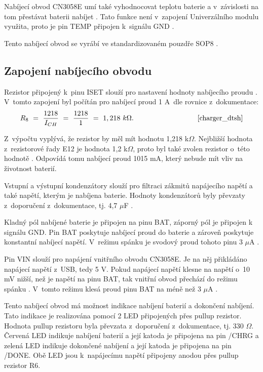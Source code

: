 Nabíjecí obvod CN3058E umí také vyhodnocovat teplotu baterie a v~závislosti na tom přestávat baterii nabíjet \cite{charger_dtsh}. Tato funkce není v~zapojení
Univerzálního modulu využita, proto je pin TEMP připojen k~signálu GND \cite{charger_dtsh}.

Tento nabíjecí obvod se vyrábí ve standardizovaném pouzdře SOP8 \cite{charger_dtsh}.

\subsection{Zapojení nabíjecího obvodu}
Rezistor připojený k~pinu ISET slouží pro nastavení hodnoty nabíjecího proudu \cite{charger_dtsh}. V~tomto zapojení byl počítán pro nabíjecí proud 1 A~dle rovnice
z~dokumentace: 
\begin{equation} 
  R_{8}~=~\frac{1218}{I_{CH}}~=~\frac{1218}{1}~=~1,218~k\Omega. 
  \quad \quad \quad \quad \quad \quad \quad \quad \quad \cite{charger_dtsh}
\label{eq:I_CH}
\end{equation}

Z~výpočtu vyplývá, že rezistor by měl mít hodnotu 1,218 k$\Omega$. Nejbližší hodnota z~rezistorové řady E12 je hodnota 1,2 k$\Omega$, proto byl také zvolen rezistor 
o~této hodnotě \cite{rezistorova_rada}. Odpovídá tomu nabíjecí proud 1015 mA, který nebude mít vliv na životnost baterií. 

Vstupní a výstupní kondenzátory slouží pro filtraci zákmitů napájecího napětí a také napětí, kterým je nabíjena baterie. Hodnoty kondenzátorů byly převzaty
z~doporučení z~dokumentace, tj. 4,7 $\mu$F \cite{charger_dtsh}.

Kladný pól nabíjené baterie je připojen na pinu BAT, záporný pól je připojen k signálu GND. Pin BAT poskytuje nabíjecí proud do baterie a zároveň poskytuje konstantní 
nabíjecí napětí. V~režimu spánku je svodový proud tohoto pinu 3 $\mu$A \cite{charger_dtsh}. 

Pin VIN slouží pro napájení vnitřního obvodu CN3058E. Je na něj přikládáno napájecí napětí z~USB, tedy 5 V. Pokud napájecí napětí klesne na napětí o~10 mV nižší, 
než je napětí na pinu BAT, tak vnitřní obvod přechází do režimu spánku \cite{charger_dtsh}. V~tomto režimu klesá proud pinu BAT na méně než 3 $\mu$A \cite{charger_dtsh}.

Tento nabíjecí obvod má možnost indikace nabíjení baterií a dokončení nabíjení. Tato indikace je realizována pomocí 2 LED připojených přes pullup rezistor. Hodnota
pullup rezistoru byla převzata z~doporučení z~dokumentace, tj. 330 $\Omega$. Červená LED indikuje nabíjení baterií a její katoda je připojena na pin /CHRG a zelená LED
indikuje dokončené nabíjení a její katoda je připojena na pin /DONE. Obě LED jsou k~napájecímu napětí připojeny anodou přes pullup rezistor R6. 

